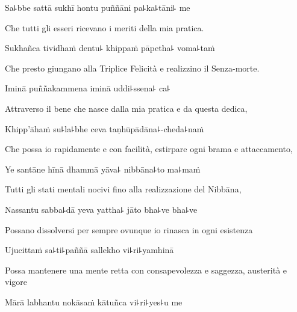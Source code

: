 Sa꜕bbe sattā sukhī hontu puññāni pa꜕ka꜕tāni꜕ me\\
  \begin{english}   
    Che tutti gli esseri ricevano i meriti della mia pratica.
  \end{english}

  \clearpage

Sukhañca tividhaṁ dentu꜕ khippaṁ pāpetha꜕ voma꜕taṁ\\

  \begin{english} 
Che presto giungano alla Triplice Felicità e realizzino il Senza-morte.
  \end{english}

Iminā puññakammena iminā uddi꜕ssena꜕ ca꜕\\
  \begin{english} 
Attraverso il bene che nasce dalla mia pratica e da questa dedica,
  \end{english}

Khipp'āhaṁ su꜕la꜕bhe ceva taṇhūpādāna꜕-cheda꜕naṁ\\

  \begin{english}
    Che possa io rapidamente e con facilità, estirpare ogni brama e attaccamento, 
  \end{english}

Ye santāne hīnā dhammā yāva꜕ nibbāna꜕to ma꜕maṁ\\

  \begin{english}   
Tutti gli stati mentali nocivi fino alla realizzazione del Nibbāna,
  \end{english}

Nassantu sabba꜕dā yeva yattha꜕ jāto bha꜕ve bha꜕ve\\

  \begin{english} 
    Possano dissolversi per sempre ovunque io rinasca in ogni esistenza
  \end{english}

Ujucittaṁ sa꜕ti꜕paññā sallekho vi꜕ri꜕yamhinā\\

  \begin{english} 
Possa mantenere una mente retta con consapevolezza e saggezza, austerità e vigore
  \end{english}

Mārā labhantu nokāsaṁ kātuñca vi꜕ri꜕yes꜕u me\\

